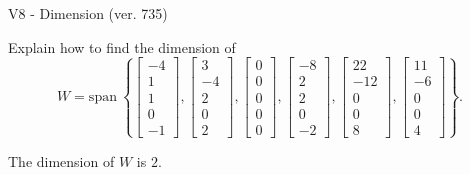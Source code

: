 \begin{exercise}
  \begin{exerciseTitle}V8 - Dimension (ver. 735)\end{exerciseTitle}
  \begin{exerciseStatement}
    Explain how to find the dimension of 
\[W=\mathrm{span}\ \left\{\left[\begin{array}{r}
-4 \\
1 \\
1 \\
0 \\
-1
\end{array}\right] , \left[\begin{array}{r}
3 \\
-4 \\
2 \\
0 \\
2
\end{array}\right] , \left[\begin{array}{r}
0 \\
0 \\
0 \\
0 \\
0
\end{array}\right] , \left[\begin{array}{r}
-8 \\
2 \\
2 \\
0 \\
-2
\end{array}\right] , \left[\begin{array}{r}
22 \\
-12 \\
0 \\
0 \\
8
\end{array}\right] , \left[\begin{array}{r}
11 \\
-6 \\
0 \\
0 \\
4
\end{array}\right]\right\}.\]



  \end{exerciseStatement}
  \begin{exerciseAnswer}
   The dimension of \(W\) is  \(2\).
  


  \end{exerciseAnswer}
\end{exercise}